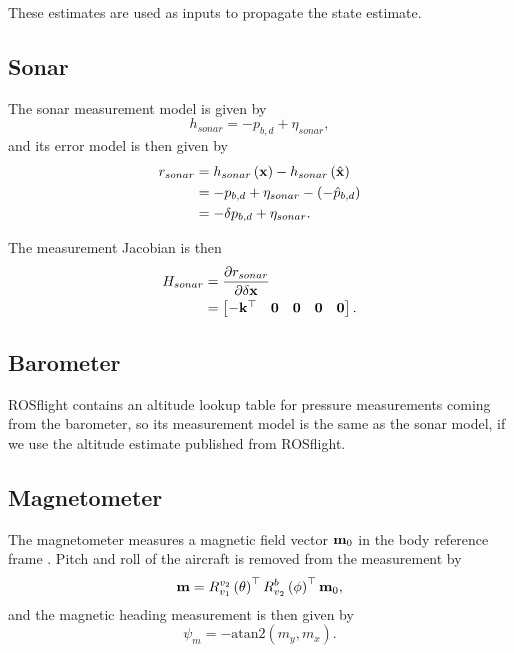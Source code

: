 \documentclass[english]{article}
\begin{document}
These estimates are used as inputs to propagate the state estimate.

\subsection{Sonar}

The sonar measurement model is given by
\begin{equation}
h_{sonar} = -p_{b,d} + \eta_{sonar},
\end{equation}
and its error model is then given by
\begin{align}
r_{sonar} & = h_{sonar}\left({\bf x}\right) - h_{sonar}\left(\hat{{\bf x}}\right) \\
& = -p_{b,d} + \eta_{sonar} - \left(-\hat{p}_{b,d}\right) \\
& = -\delta p_{b,d} + \eta_{sonar}.
\end{align}

The measurement Jacobian is then
\begin{align}
H_{sonar} & = \frac{\partial r_{sonar}}{\partial \delta {\bf x}} \\
& = \begin{bmatrix} -{\bf k}^\top & {\bf 0} & {\bf 0} & {\bf 0} & {\bf 0} \end{bmatrix}.
\end{align}

\subsection{Barometer}

ROSflight contains an altitude lookup table for pressure measurements coming from the barometer, so its measurement model is the same as the sonar model, if we use the altitude estimate published from ROSflight.

\subsection{Magnetometer}

The magnetometer measures a magnetic field vector ${\bf m}_0$ in the body reference frame \cite{key-3}. Pitch and roll of the aircraft is removed from the measurement by
\begin{equation}
{\bf m} = R_{v_1}^{v_2}\left(\theta\right)^\top R_{v_2}^b\left(\phi\right)^\top {\bf m}_0,
\end{equation}
and the magnetic heading measurement is then given by
\begin{equation}
\psi_m = -\mathrm{atan2} \left( m_y, m_x \right).
\end{equation}
\end{document}
